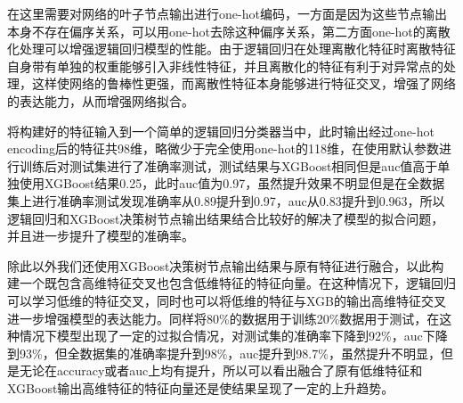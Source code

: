 在这里需要对网络的叶子节点输出进行one-hot编码，一方面是因为这些节点输出本身不存在偏序关系，可以用one-hot去除这种偏序关系，第二方面one-hot的离散化处理可以增强逻辑回归模型的性能。由于逻辑回归在处理离散化特征时离散特征自身带有单独的权重能够引入非线性特征，并且离散化的特征有利于对异常点的处理，这样使网络的鲁棒性更强，而离散性特征本身能够进行特征交叉，增强了网络的表达能力，从而增强网络拟合。

将构建好的特征输入到一个简单的逻辑回归分类器当中，此时输出经过one-hot encoding后的特征共98维，略微少于完全使用one-hot的118维，在使用默认参数进行训练后对测试集进行了准确率测试，测试结果与XGBoost相同但是auc值高于单独使用XGBoost结果0.25，此时auc值为0.97，虽然提升效果不明显但是在全数据集上进行准确率测试发现准确率从0.89提升到0.97，auc从0.83提升到0.963，所以逻辑回归和XGBoost决策树节点输出结果结合比较好的解决了模型的拟合问题，并且进一步提升了模型的准确率。

除此以外我们还使用XGBoost决策树节点输出结果与原有特征进行融合，以此构建一个既包含高维特征交叉也包含低维特征的特征向量。在这种情况下，逻辑回归可以学习低维的特征交叉，同时也可以将低维的特征与XGB的输出高维特征交叉进一步增强模型的表达能力。同样将80\%的数据用于训练20\%数据用于测试，在这种情况下模型出现了一定的过拟合情况，对测试集的准确率下降到92\%，auc下降到93\%，但全数据集的准确率提升到98\%，auc提升到98.7\%，虽然提升不明显，但是无论在accuracy或者auc上均有提升，所以可以看出融合了原有低维特征和XGBoost输出高维特征的特征向量还是使结果呈现了一定的上升趋势。

